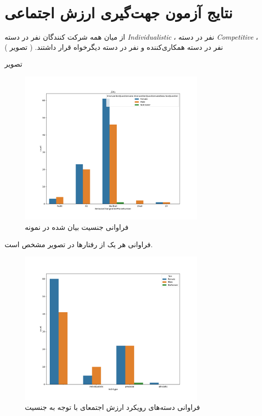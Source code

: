 \section{نتایج آزمون جهت‌گیری ارزش اجتماعی}
از میان همه شرکت کنندگان
\noOfIndividualisticParticipants
نفر در دسته
\textit{
    \gls{Individualistic}
}
،
\noOfCompetitiveParticipants
نفر در دسته
\textit{
    \gls{Competitive}
}
،
\noOfCooperativeParticipants
نفر در دسته
همکاری‌کننده
و
\noOfAltruisticParticipants
نفر در دسته
دیگر‌خواه
قرار داشتند.
(
تصویر \label{fig:SVOAgainstPopulation}
)

تصویر \label{fig:sexualityAndSVOAgainstPopulation}


\begin{figure}[htpb]
    \centering
    \includegraphics[width=0.8\textwidth]{./img/Frequency_Behavior_Phnone_Number.pdf}
    \caption{فراوانی جنسیت بیان شده در نمونه}
    \label{fig:Frequency_Behavior_Phnone_Number}
\end{figure}

فراوانی هر یک از رفتارها در
تصویر \label{fig:Frequency_Behavior_Phnone_Number}
مشخص است.


\begin{figure}[htpb]
    \centering
    \includegraphics[width=0.8\textwidth]{./img/sexualityAndSVOAgainstPopulation.pdf}
    \caption{فراوانی دسته‌های رویکرد ارزش اجتمعای با توجه به جنسیت}
    \label{fig:sexualityAndSVOAgainstPopulation}
\end{figure}


